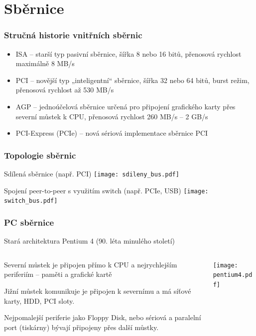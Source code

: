 \documentclass{beamer}
\begin{document}
\section{Sběrnice}

\begin{frame}
\frametitle{Stručná historie vnitřních sběrnic}

\begin{itemize}
\item ISA – starší typ pasivní sběrnice, šířka 8 nebo 16 bitů, přenosová rychlost maximálně 8 MB/s
\item PCI – novější typ „inteligentní“ sběrnice, šířka 32 nebo 64 bitů, burst režim, přenosová rychlost až 530 MB/s
\item AGP – jednoúčelová sběrnice určená pro připojení grafického karty přes severní můstek k CPU, přenosová rychlost 260 MB/s – 2 GB/s
\item PCI-Express (PCIe) – nová sériová implementace sběrnice PCI
\end{itemize}
\end{frame}


\begin{frame}
\frametitle{Topologie sběrnic}
\begin{center}
Sdílená sběrnice (např. PCI)
\texttt{[image: sdileny\_bus.pdf]}
\end{center}

\begin{center}
Spojení peer-to-peer s využitím switch (např. PCIe, USB)
\texttt{[image: switch\_bus.pdf]}
\end{center}
\end{frame}

\begin{frame}
\frametitle{PC sběrnice}
\begin{center}
Stará architektura Pentium 4 (90. léta minulého století)
\end{center}

\begin{columns}
\begin{column}{0.5\textwidth}
Severní můstek je připojen přímo k CPU a nejrychlejším periferiím -- paměti a grafické kartě
\bigskip

Jižní můstek komunikuje je připojen k severnímu a má síťové karty, HDD, PCI sloty.

\bigskip
Nejpomalejší periferie jako Floppy Disk, nebo sériová a paralelní port (tiskárny) bývají připojeny přes další můstky.
\end{column}
\begin{column}{0.5\textwidth}  
\texttt{[image: pentium4.pdf]}
\end{column}
\end{columns}
\end{frame}
\end{document}
